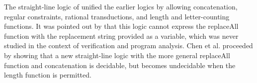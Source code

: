 The straight-line logic of \cite{LB16} unified the earlier logics by allowing concatenation, regular constraints, rational
transductions, and length and letter-counting functions. It was pointed out by \cite{CCH+18}
that this logic cannot express the replaceAll function with the replacement string provided as a
variable, which was never studied in the context of verification and program analysis. Chen et al.
proceeded by showing that a new straight-line logic with the more general replaceAll function and
concatenation is decidable, but becomes undecidable when the length function is permitted.



